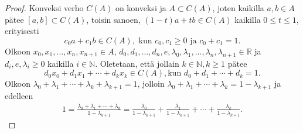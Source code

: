 \documentclass[12pt,a4paper,leqno]{report}
\newcommand{\R}{\mathbb{R}}
\newcommand{\N}{\mathbb{N}}
\theoremstyle{plain}
\theoremstyle{definition}
\theoremstyle{remark}
\begin{document}
\begin{proof}
Konveksi verho $C(A)$ on konveksi ja $A\subset C(A)$, 
joten kaikilla $a,b\in A$ pätee $[a,b]\subset C(A)$, 
toisin sanoen, $(1-t)a+tb\in C(A)$ kaikilla $0\leq t \leq 1$, 
erityisesti 
\begin{equation*}\label{konvsis}
c_0 a+c_1 b \in C(A),\text{ kun }c_0,c_1\geq 0\text{ ja }c_0 +c_1=1.
\end{equation*}
Olkoon $x_0,x_1,\dots, x_n, x_{n+1} \in A$, 
$d_0,d_1,\dots, d_n,e, \lambda_0 ,\lambda_1,\dots,\lambda_{n},\lambda_{n+1} \in \R$ 
ja $d_i,e, \lambda_{i}\geq 0$ kaikilla $ i\in\N$. 
Oletetaan, että jollain $k\in\N,k\geq 1$ pätee 
\begin{equation}\label{konvoletus}
d_0 x_0+d_1 x_1+\cdots+d_{k} x_{k}\in C(A), \text{kun } d_0+d_1+\cdots+ d_{k} =1.
 \end{equation}
%
%
%
%
%
%
%
Olkoon 
$\lambda_0+\lambda_1+\cdots+ \lambda_{k}+ \lambda_{k+1}=1$, 
jolloin $\lambda_0+\lambda_1+\cdots+ \lambda_{k}=1- \lambda_{k+1}$ 
ja edelleen 
\begin{equation}\label{konvsumma}
\begin{split}
1=\frac{\lambda_0+\lambda_1+\cdots+ \lambda_{k}}{1- \lambda_{k+1}}
 =\frac{ \lambda_0}{1-\lambda_{k+1}} +\frac{ \lambda_1}{1-\lambda_{k+1}} +\cdots+\frac{ \lambda_k}{1-\lambda_{k+1}} .
\end{split}
\end{equation}

\end{proof}
\end{document}
